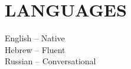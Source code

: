 \documentclass[margin]{res}
\begin{document}
\begin{resume}
\begin{itemize}
      \end{itemize}
      
      \section{LANGUAGES}
      English -- Native \\
      Hebrew -- Fluent \\
      Russian -- Conversational            
      
\end{resume}
\end{document}
